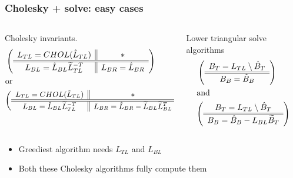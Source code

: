 \documentclass{beamer}
\begin{document}
\begin{frame}
  \frametitle{Cholesky + solve: easy cases}
  \begin{columns}
    \begin{column}[t]{0.45\textwidth}
      Cholesky invariants.
      \begin{align*}
        &\left( \begin{array}{c || c} L_{TL} = CHOL(\hat{L}_{TL}) & * \\ \hline \hline L_{BL} = \hat{L}_{BL}\widetilde{L}_{TL}^{-T} & L_{BR} = \hat{L}_{BR} \end{array} \right)\\
        &\text{or}\\
        &{\small \left( \begin{array}{c || c} L_{TL} = CHOL(\hat{L}_{TL}) & * \\ \hline \hline L_{BL} = \hat{L}_{BL}\widetilde{L}_{TL}^{-T} & L_{BR} = \hat{L}_{BR} - \widetilde{L}_{BL}\widetilde{L}_{BL}^T \end{array} \right)}
      \end{align*}
    \end{column}
    \begin{column}[t]{0.55\textwidth}
      Lower triangular solve algorithms
      \begin{align*}
        &\left( \begin{array}{c} B_T = L_{TL} \setminus \hat{B}_T \\ \hline \hline B_B = \hat{B}_B \end{array} \right)\\
        &\text{and}\\
        &{\left( \begin{array}{c} B_T = L_{TL} \setminus \hat{B}_T \\ \hline \hline B_B = \hat{B}_B - L_{BL}\widetilde{B}_T \end{array} \right)}
      \end{align*}
    \end{column}
  \end{columns}

  \begin{itemize}
  \item Greediest algorithm needs $L_{TL}$ and $L_{BL}$
  \item Both these Cholesky algorithms fully compute them
  \end{itemize}
\end{frame}
\end{document}
